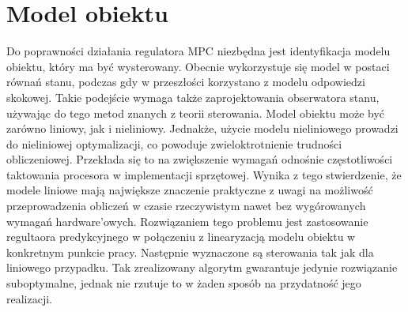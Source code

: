 \section{Model obiektu} \label{sec:model}
Do poprawności działania regulatora MPC niezbędna jest identyfikacja modelu obiektu, który ma być wysterowany.
Obecnie wykorzystuje się model w postaci równań stanu, podczas gdy w przeszłości korzystano z modelu
odpowiedzi skokowej. Takie podejście wymaga także zaprojektowania obserwatora stanu, używając do tego
metod znanych z teorii sterowania. Model obiektu może być zarówno liniowy, jak i nieliniowy. Jednakże,
użycie modelu nieliniowego prowadzi do nieliniowej optymalizacji, co powoduje zwieloktrotnienie trudności
obliczeniowej. Przekłada się to na zwiększenie wymagań odnośnie częstotliwości taktowania procesora
w implementacji sprzętowej. Wynika z tego stwierdzenie, że modele liniowe mają największe znaczenie
praktyczne z uwagi na możliwość przeprowadzenia obliczeń w czasie rzeczywistym nawet bez wygórowanych
wymagań hardware'owych. Rozwiązaniem tego problemu jest zastosowanie regultaora predykcyjnego w połączeniu
z linearyzacją modelu obiektu w konkretnym punkcie pracy. Następnie wyznaczone są sterowania tak jak dla
liniowego przypadku. Tak zrealizowany algorytm gwarantuje jedynie rozwiązanie suboptymalne, jednak nie
rzutuje to w żaden sposób na przydatność jego realizacji.

